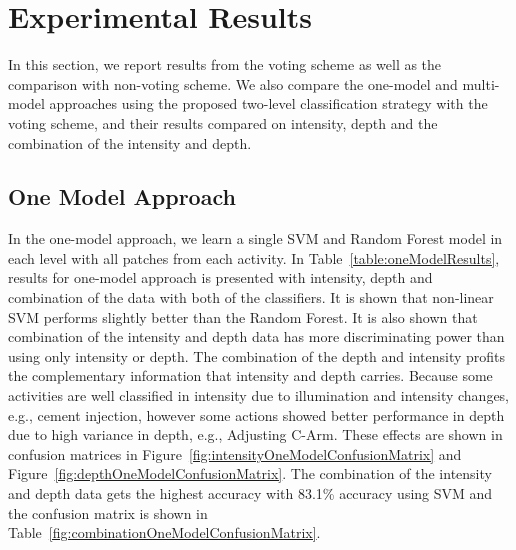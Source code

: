 \section{Experimental Results}
\label{section:ExperimentalResults}

In this section, we report results from the voting scheme as well as the comparison with non-voting scheme. We also compare the one-model and multi-model approaches using the proposed two-level classification strategy with the voting scheme, and their results compared on intensity, depth and the combination of the intensity and depth.

    
\subsection{One Model Approach}
\label{section:OneModelExperiments}
In the one-model approach, we learn a single SVM and Random Forest model in each level with all patches from each activity. In Table~\ref{table:oneModelResults}, results for one-model approach is presented with intensity, depth and combination of the data with both of the classifiers. It is shown that non-linear SVM performs slightly better than the Random Forest. It is also shown that combination of the intensity and depth data has more discriminating power than using only intensity or depth. The combination of the depth and intensity profits the complementary information that intensity and depth carries. Because some activities are well classified in intensity due to illumination and intensity changes, e.g., cement injection, however some actions showed better performance in depth due to high variance in depth, e.g., Adjusting C-Arm. These effects are shown in confusion matrices in Figure~\ref{fig:intensityOneModelConfusionMatrix} and Figure~\ref{fig:depthOneModelConfusionMatrix}. The combination of the intensity and depth data gets the highest accuracy with 83.1\% accuracy using SVM and the confusion matrix is shown in Table~\ref{fig:combinationOneModelConfusionMatrix}.


